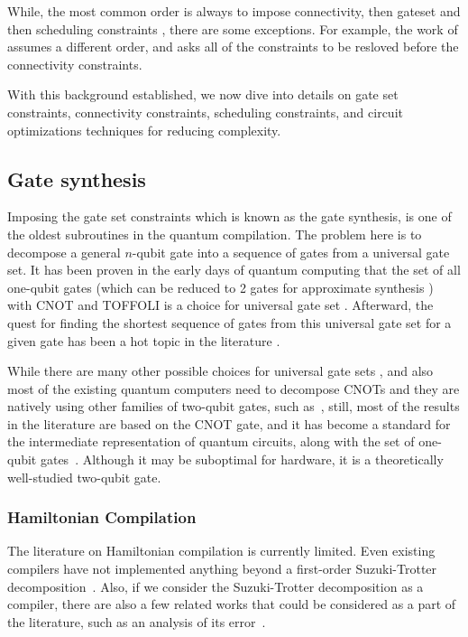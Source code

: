 \documentclass{report}
\begin{document}
While, the most common order is always to impose connectivity, then gateset and then scheduling constraints \cite{TODO}, there are some exceptions. For example, the work of \cite{wille2020} assumes a different order, and asks all of the constraints to be resloved before the connectivity constraints.


With this background established, we now dive into details on gate set constraints, connectivity constraints, scheduling constraints, and circuit optimizations techniques for reducing complexity.

\subsection{Gate synthesis}

Imposing the gate set constraints which is known as the gate synthesis, is one of the oldest subroutines in the quantum compilation. The problem here is to decompose a general $n$-qubit gate into a sequence of gates from a universal gate set. It has been proven in the early days of quantum computing that the set of all one-qubit gates (which can be reduced to 2 gates for approximate synthesis \cite{TODO}) with CNOT and TOFFOLI is a choice for universal gate set \cite{barenco1995}. Afterward, the quest for finding the shortest sequence of gates from this universal gate set for a given gate has been a hot topic in the literature \cite{shende2006,vatan2004}.

While there are many other possible choices for universal gate sets \cite{TODO}, and also most of the existing quantum computers need to decompose CNOTs and they are natively using other families of two-qubit gates, such as~\cite{foxen2020}, still, most of the results in the literature are based on the CNOT gate, and it has become a standard for the intermediate representation of quantum circuits, along with the set of one-qubit gates~\cite{zulehner2018,siraichi2018,li2019,zhang2021,zhou2020,itoko2019,murali2019,sivarajah2021}. Although it may be suboptimal for hardware, it is a theoretically well-studied two-qubit gate.

\subsubsection{Hamiltonian Compilation}

\cite{lao2021,campbell2019,childs2021}

The literature on Hamiltonian compilation is currently limited. Even existing compilers have not implemented anything beyond a first-order Suzuki-Trotter decomposition~\cite{sivarajah2021, qiskit2023}. Also, if we consider the Suzuki-Trotter decomposition as a compiler, there are also a few related works that could be considered as a part of the literature, such as an analysis of its error~\cite{childs2021}.
\end{document}
